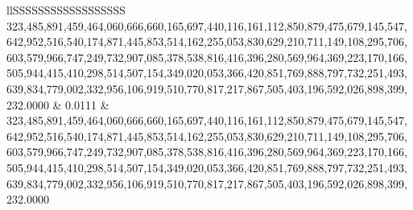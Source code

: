 \begin{table}
\begin{tabular}{llSSSSSSSSSSSSSSSSSS}
323,485,891,459,464,060,666,660,165,697,440,116,161,112,850,879,475,679,145,547,642,952,516,540,174,871,445,853,514,162,255,053,830,629,210,711,149,108,295,706,603,579,966,747,249,732,907,085,378,538,816,416,396,280,569,964,369,223,170,166,505,944,415,410,298,514,507,154,349,020,053,366,420,851,769,888,797,732,251,493,639,834,779,002,332,956,106,919,510,770,817,217,867,505,403,196,592,026,898,399,232.0000 & 0.0111           & 323,485,891,459,464,060,666,660,165,697,440,116,161,112,850,879,475,679,145,547,642,952,516,540,174,871,445,853,514,162,255,053,830,629,210,711,149,108,295,706,603,579,966,747,249,732,907,085,378,538,816,416,396,280,569,964,369,223,170,166,505,944,415,410,298,514,507,154,349,020,053,366,420,851,769,888,797,732,251,493,639,834,779,002,332,956,106,919,510,770,817,217,867,505,403,196,592,026,898,399,232.0000 \\

\end{tabular}
\end{table}
